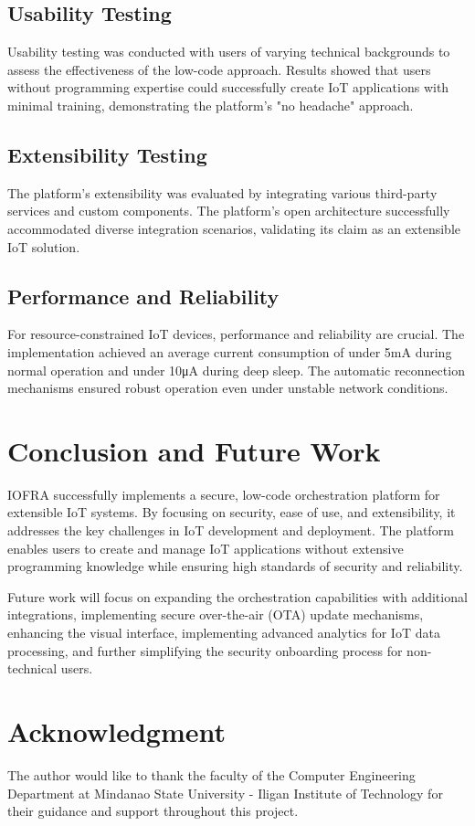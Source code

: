 \documentclass[conference]{IEEEtran}
\begin{document}
\subsection{Usability Testing}
Usability testing was conducted with users of varying technical backgrounds to assess the effectiveness of the low-code approach. Results showed that users without programming expertise could successfully create IoT applications with minimal training, demonstrating the platform's "no headache" approach.

\subsection{Extensibility Testing}
The platform's extensibility was evaluated by integrating various third-party services and custom components. The platform's open architecture successfully accommodated diverse integration scenarios, validating its claim as an extensible IoT solution.

\subsection{Performance and Reliability}
For resource-constrained IoT devices, performance and reliability are crucial. The implementation achieved an average current consumption of under 5mA during normal operation and under 10μA during deep sleep. The automatic reconnection mechanisms ensured robust operation even under unstable network conditions.

\section{Conclusion and Future Work}
IOFRA successfully implements a secure, low-code orchestration platform for extensible IoT systems. By focusing on security, ease of use, and extensibility, it addresses the key challenges in IoT development and deployment. The platform enables users to create and manage IoT applications without extensive programming knowledge while ensuring high standards of security and reliability.

Future work will focus on expanding the orchestration capabilities with additional integrations, implementing secure over-the-air (OTA) update mechanisms, enhancing the visual interface, implementing advanced analytics for IoT data processing, and further simplifying the security onboarding process for non-technical users.

\section{Acknowledgment}
The author would like to thank the faculty of the Computer Engineering Department at Mindanao State University - Iligan Institute of Technology for their guidance and support throughout this project.
\end{document}
